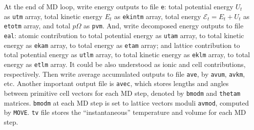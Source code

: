 At the end of MD loop, write energy outputs to file \texttt{e}: total potential energy $U_t$ as 
\texttt{utm} array, total kinetic energy $E_t$ as \texttt{ekintm} array,
total energy $\mathscr{E}_t = E_t + U_t$ as \texttt{etotm} array, and
total $p \Omega$ as \texttt{pvm}. And, write decomposed energy outputs
to file \texttt{eal}: atomic contribution to total potential energy as 
\texttt{utam} array, to total kinetic energy as \texttt{ekam} array,
to total energy as \texttt{etam} array; and lattice contribution to
total potential energy as \texttt{utlm} array, to total kinetic 
energy as \texttt{eklm} array,
to total energy as \texttt{etlm} array. It could be also understood as
ionic and cell contributions, respectively. Then write average accumulated
outputs to file \texttt{ave}, by \texttt{avum}, \texttt{avkm}, etc. Another
important output file is \texttt{avec}, which stores lengths and angles 
between primitive cell vectors for each MD step, 
denoted by \texttt{bmodm} and
\texttt{thetam} matrices. \texttt{bmodm} at each MD step
is set to lattice vectors moduli \texttt{avmod}, computed by \texttt{MOVE}.
\texttt{tv} file stores the ``instantaneous'' temperature and volume
for each MD step.


